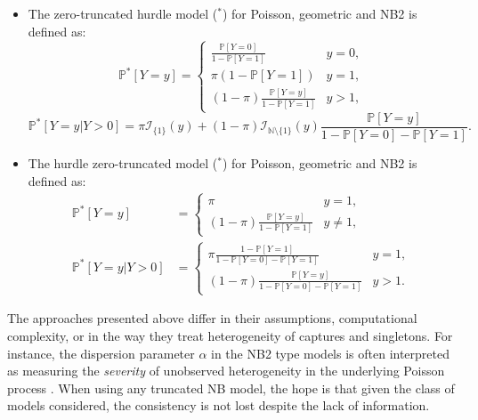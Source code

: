 \documentclass[
]{jss}
\newcommand{\1}{\mathcal{I}} \newcommand{\bZero}{\boldsymbol{0}}
\begin{document}
\begin{itemize}
    \item The zero-truncated hurdle model ($^\ast$) for Poisson, geometric and NB2 is defined as:
    \begin{equation*}
        \mathbb{P}^{\ast}[Y=y]=\begin{cases}
        \frac{\mathbb{P}[Y=0]}{1-\mathbb{P}[Y=1]} & y=0, \\
        \pi(1-\mathbb{P}[Y=1]) & y=1, \\
        (1-\pi) \frac{\mathbb{P}[Y=y]}{1-\mathbb{P}[Y=1]} & y>1,
        \end{cases}
    \end{equation*}
    \begin{equation*}
        \mathbb{P}^{\ast}[Y=y|Y>0]=\pi\mathcal{I}_{\{1\}}(y)+
        (1-\pi)\mathcal{I}_{\mathbb{N}\setminus\{1\}}(y)\frac{\mathbb{P}[Y=y]}{1-\mathbb{P}[Y=0]-\mathbb{P}[Y=1]}.
    \end{equation*}
    \item The hurdle zero-truncated model ($^\ast$) for Poisson, geometric and NB2 is defined as:
    \begin{align*}
        \mathbb{P}^{\ast}[Y=y]&=\begin{cases}
        \pi & y=1, \\
        (1-\pi) \frac{\mathbb{P}[Y=y]}{1-\mathbb{P}[Y=1]} & y\neq1,
        \end{cases}\\
        \mathbb{P}^{\ast}[Y=y|Y>0]&=\begin{cases}
            \pi\frac{1-\mathbb{P}[Y=1]}{1-\mathbb{P}[Y=0]-\mathbb{P}[Y=1]} & y=1,\\
            (1-\pi)\frac{\mathbb{P}[Y=y]}{1-\mathbb{P}[Y=0]-\mathbb{P}[Y=1]} & y>1.
        \end{cases}
    \end{align*}
\end{itemize}

The approaches presented above differ in their assumptions,
computational complexity, or in the way they treat heterogeneity of
captures and singletons. For instance, the dispersion parameter
\(\alpha\) in the NB2 type models is often interpreted as measuring the
\textit{severity} of unobserved heterogeneity in the underlying Poisson
process \citep[cf.][]{ztnegbin}. When using any truncated NB model, the
hope is that given the class of models considered, the consistency is
not lost despite the lack of information.
\end{document}
